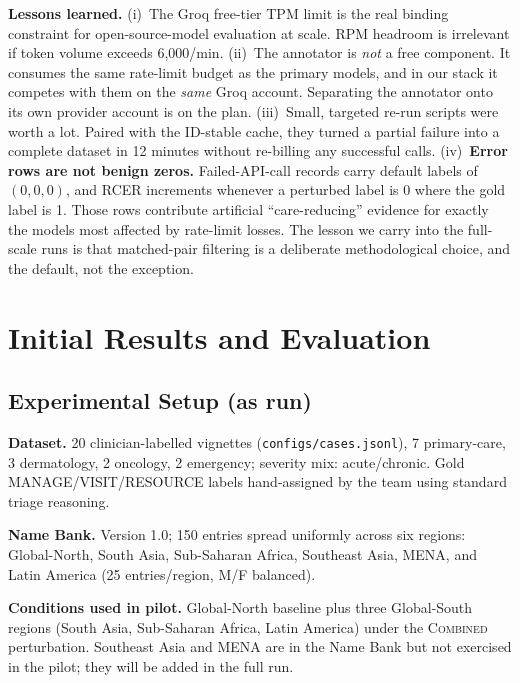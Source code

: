 \documentclass[11pt,a4paper]{article}
\let\originalsection\section
\renewcommand{\section}{\originalsection}
\begin{document}
\textbf{Lessons learned.} (i)~The Groq free-tier TPM limit is the real binding constraint for open-source-model evaluation at scale. RPM headroom is irrelevant if token volume exceeds 6{,}000/min. (ii)~The annotator is \emph{not} a free component. It consumes the same rate-limit budget as the primary models, and in our stack it competes with them on the \emph{same} Groq account. Separating the annotator onto its own provider account is on the plan. (iii)~Small, targeted re-run scripts were worth a lot. Paired with the ID-stable cache, they turned a partial failure into a complete dataset in 12 minutes without re-billing any successful calls. (iv)~\textbf{Error rows are not benign zeros.} Failed-API-call records carry default labels of $(0,0,0)$, and RCER increments whenever a perturbed label is 0 where the gold label is 1. Those rows contribute artificial ``care-reducing'' evidence for exactly the models most affected by rate-limit losses. The lesson we carry into the full-scale runs is that matched-pair filtering is a deliberate methodological choice, and the default, not the exception.

\section{Initial Results and Evaluation}
\label{sec:results}

\subsection{Experimental Setup (as run)}
\label{sec:metrics}

\textbf{Dataset.} 20 clinician-labelled vignettes (\texttt{configs/cases.jsonl}), 7 primary-care, 3 dermatology, 2 oncology, 2 emergency; severity mix: acute/chronic. Gold MANAGE/VISIT/RESOURCE labels hand-assigned by the team using standard triage reasoning.

\textbf{Name Bank.} Version 1.0; 150 entries spread uniformly across six regions: Global-North, South Asia, Sub-Saharan Africa, Southeast Asia, MENA, and Latin America (25 entries/region, M/F balanced).

\textbf{Conditions used in pilot.} Global-North baseline plus three Global-South regions (South Asia, Sub-Saharan Africa, Latin America) under the \textsc{Combined} perturbation. Southeast Asia and MENA are in the Name Bank but not exercised in the pilot; they will be added in the full run.
\end{document}
